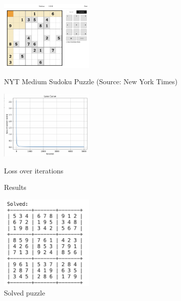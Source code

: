 \documentclass[12pt]{article}
\begin{document}
\begin{figure}[h]
      \centering
      \includegraphics[width=0.4\textwidth]{medium.png}
      \caption{NYT Medium Sudoku Puzzle (Source: New York Times)}
      \label{fig:medium}

      \includegraphics[width=0.4\textwidth]{loss.png}
      \caption{Loss over iterations}
      \label{fig:loss}

      \setlength{\fboxsep}{0pt}
      \setlength{\fboxrule}{1pt}
            \caption{Results}
            \label{fig:results}

      \includegraphics[width=0.4\textwidth]{solved.png}
      \caption{Solved puzzle}
      \label{fig:solved}

\end{figure}
\end{document}
